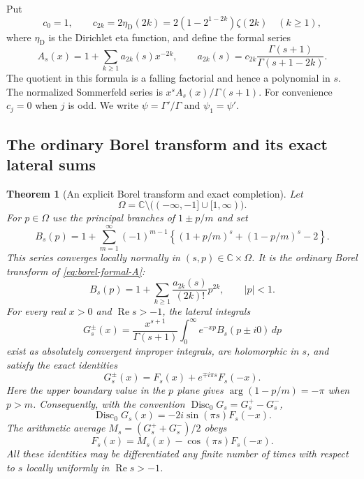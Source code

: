 \documentclass[11pt,a4paper]{article}
\numberwithin{equation}{section}
\newtheorem{theorem}{Theorem}[section]
\theoremstyle{definition}
\theoremstyle{remark}
\begin{document}
Put
\begin{equation}\label{eq:borel-c-def}
 c_0=1,\qquad c_{2k}=2\eta_{\mathrm D}(2k)
 =2(1-2^{1-2k})\zeta(2k)\quad(k\geq1),
\end{equation}
where $\eta_{\mathrm D}$ is the Dirichlet eta function, and define the formal series
\begin{equation}\label{eq:borel-formal-A}
 A_s(x)=1+\sum_{k\geq1}a_{2k}(s)x^{-2k},\qquad
 a_{2k}(s)=c_{2k}\frac{\Gamma(s+1)}{\Gamma(s+1-2k)}.
\end{equation}
The quotient in this formula is a falling factorial and hence a polynomial
in $s$. The normalized Sommerfeld series is
$x^sA_s(x)/\Gamma(s+1)$.
For convenience $c_j=0$ when $j$ is odd. We write
$\psi=\Gamma'/\Gamma$ and $\psi_1=\psi'$.

\subsection{The ordinary Borel transform and its exact lateral sums}

\begin{theorem}[An explicit Borel transform and exact completion]
\label{thm:borel-exact}
Let
\[
 \Omega=\mathbb C\setminus
 \bigl(( -\infty,-1]\cup[1,\infty)\bigr).
\]
For $p\in\Omega$ use the principal branches of $1\pm p/m$ and set
\begin{equation}\label{eq:borel-B}
 B_s(p)=1+\sum_{m=1}^{\infty}(-1)^{m-1}
 \left\{(1+p/m)^s+(1-p/m)^s-2\right\}.
\end{equation}
This series converges locally normally in $(s,p)\in\mathbb C\times\Omega$.
It is the ordinary Borel transform of \eqref{eq:borel-formal-A}:
\begin{equation}\label{eq:borel-B-local}
 B_s(p)=1+\sum_{k\geq1}\frac{a_{2k}(s)}{(2k)!}p^{2k},
 \qquad |p|<1.
\end{equation}
For every real $x>0$ and $\operatorname{Re}s>-1$, the lateral integrals
\begin{equation}\label{eq:borel-G}
 G_s^{\pm}(x)=\frac{x^{s+1}}{\Gamma(s+1)}
 \int_0^\infty e^{-xp}B_s(p\pm i0)\,dp
\end{equation}
exist as absolutely convergent improper integrals, are holomorphic in $s$,
and satisfy the exact identities
\begin{equation}\label{eq:borel-G-exact}
 \boxed{\ G_s^{\pm}(x)=F_s(x)+e^{\mp i\pi s}F_s(-x).\ }
\end{equation}
Here the upper boundary value in the $p$ plane gives
$\arg(1-p/m)=-\pi$ when $p>m$. Consequently, with the convention
$\operatorname{Disc}_0G_s=G_s^+-G_s^-$,
\begin{equation}\label{eq:borel-disc}
 \operatorname{Disc}_0G_s(x)=-2i\sin(\pi s)F_s(-x).
\end{equation}
The arithmetic average $M_s=(G_s^++G_s^-)/2$ obeys
\begin{equation}\label{eq:borel-median}
 F_s(x)=M_s(x)-\cos(\pi s)F_s(-x).
\end{equation}
All these identities may be differentiated any finite number of times
with respect to $s$ locally uniformly in $\operatorname{Re}s>-1$.
\end{theorem}
\end{document}
